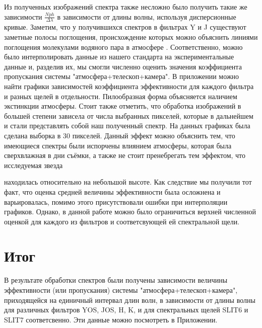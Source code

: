\documentclass[a4paper]{article}
\begin{document}
Из полученных изображений спектра также несложно было получить такие же зависимости $\frac{Nph}{\Delta\lambda}$ в зависимости от длины волны, используя дисперсионные кривые. Заметим, что у получившихся спектров в фильтрах Y и J существуют заметные полосы поглощения, происхождение которых можно объяснить линиями поглощения молекулами водяного пара в атмосфере \cite{vapour}. Соответственно, можно было интерполировать данные из нашего стандарта на экспериментальные данные и, разделив их, мы смогли численно оценить значения коэффициента пропускания системы "атмосфера+телескоп+камера". В приложении можно найти графики зависимостей коэффициента эффективности для каждого фильтра и разных щелей в отдельности. Пилообразная форма объясняется наличием экстинкции атмосферы. Стоит также отметить, что обработка изображений в большей степени зависела от числа выбранных пикселей, которые в дальнейшем и стали представлять собой наш полученный спектр. На данных графиках была сделана выборка в 30 пикселей. Данный эффект можно объяснить тем, что имеющиеся спектры были испорчены влиянием атмосферы, которая была сверхвлажная в дни съёмки, а также не стоит пренебрегать тем эффектом, что исследуемая звезда


\noindent находилась относительно на небольшой высоте. Как следствие мы получили тот факт, что оценка средней величины эффективности была осложнена и варьировалась, помимо этого присутствовали ошибки при интерполяции графиков. Однако, в данной работе можно было ограничиться верхней численной оценкой для каждого из фильтров и соответсвующей ей спектральной щели.

\hfill\break

\section{Итог}
В результате обработки спектров были получены зависимости величины эффективности (или пропускания) системы "атмосфера+телескоп+камера", приходящейся на единичный интервал длин волн, в зависимости от длины волны для различных фильтров YOS, JOS, H, K, и для спектральных щелей SLIT6 и SLIT7 соответсвенно. Эти данные можно посмотреть в Приложении.
\end{document}
